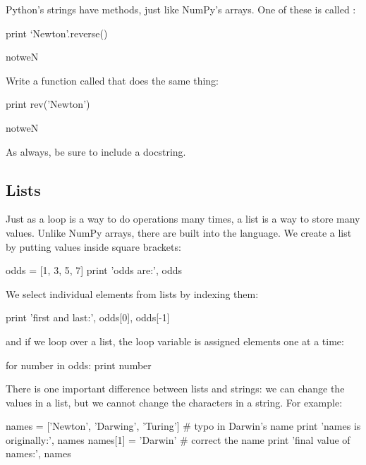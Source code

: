 \begin{challenge}
  Python's strings have methods, just like NumPy's arrays. One of these
  is called :
\begin{VerbIn}
  print `Newton'.reverse()
\end{VerbIn}

\begin{VerbOut}
notweN
\end{VerbOut}
  Write a function called  that does the same thing:
\begin{VerbIn}
print rev('Newton')
\end{VerbIn}

\begin{VerbOut}
notweN
\end{VerbOut}
  As always, be sure to include a
  docstring.
\end{challenge}

\subsection{Lists}

Just as a  loop is a way to do operations many times, a list
is a way to store many values. Unlike NumPy arrays, there are built into
the language. We create a list by putting values inside square brackets:

\begin{VerbIn}
odds = [1, 3, 5, 7]
print 'odds are:', odds
\end{VerbIn}

We select individual elements from lists by indexing them:

\begin{VerbIn}
print 'first and last:', odds[0], odds[-1]
\end{VerbIn}

and if we loop over a list, the loop variable is assigned elements one
at a time:

\begin{VerbIn}
for number in odds:
    print number
\end{VerbIn}

There is one important difference between lists and strings: we can
change the values in a list, but we cannot change the characters in a
string. For example:

\begin{VerbIn}
names = ['Newton', 'Darwing', 'Turing'] # typo in Darwin's name
print 'names is originally:', names
names[1] = 'Darwin' # correct the name
print 'final value of names:', names
\end{VerbIn}

